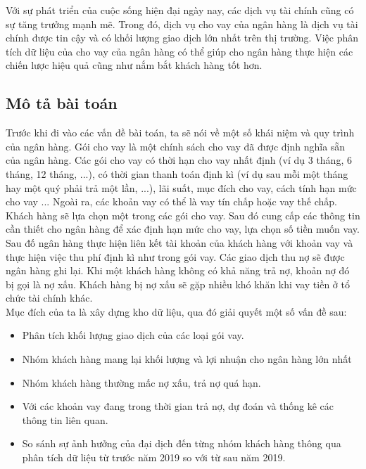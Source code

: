 \documentclass{article}
\begin{document}
\hspace{0.5cm} Với sự phát triển của cuộc sống hiện đại ngày nay, các dịch vụ tài chính cũng có sự tăng trưởng mạnh mẽ. Trong đó, dịch vụ
cho vay của ngân hàng là dịch vụ tài chính được tin cậy và có khối lượng giao dịch lớn nhất trên thị trường. 
Việc phân tích dữ liệu của cho vay của ngân hàng có thể giúp cho ngân hàng thực hiện các chiến lược hiệu quả
cũng như nắm bắt khách hàng tốt hơn.\\

\subsection{Mô tả bài toán}
\hspace{0.5cm} Trước khi đi vào các vấn đề bài toán, ta sẽ nói về một số khái niệm và quy trình của ngân hàng.
Gói cho vay là một chính sách cho vay đã được định nghĩa sẵn của ngân hàng. 
Các gói cho vay có thời hạn cho vay nhất định (ví dụ 3 tháng, 6 tháng, 12 tháng, ...), 
có thời gian thanh toán định kì (ví dụ sau mỗi một tháng hay một quý phải trả một lần, ...), lãi suất, mục đích cho vay,
cách tính hạn mức cho vay ... Ngoài ra, các khoản vay có thể là vay tín chấp hoặc vay thế chấp.\\

Khách hàng sẽ lựa chọn một trong các gói cho vay. Sau đó cung cấp các thông tin cần thiết cho ngân hàng để xác định hạn mức cho vay, lựa chọn số tiền muốn vay. Sau đố ngân hàng thực hiện liên kết tài khoản của khách hàng với khoản vay và thực hiện việc thu phí định kì
như trong gói vay. Các giao dịch thu nợ sẽ được ngân hàng ghi lại. Khi một khách hàng không có khả năng
trả nợ, khoản nợ đó bị gọi là nợ xấu. Khách hàng bị nợ xấu sẽ gặp nhiều khó khăn khi vay tiền ở tổ chức tài chính khác.\\

Mục đích của ta là xây dựng kho dữ liệu, qua đó giải quyết một số vấn đề sau:
\begin{itemize}
    \setlength\itemsep{0.3em}
    \item Phân tích khối lượng giao dịch của các loại gói vay. 
    \item Nhóm khách hàng mang lại khối lượng và lợi nhuận cho ngân hàng lớn nhất
    \item Nhóm khách hàng thường mấc nợ xấu, trả nợ quá hạn. 
    \item Với các khoản vay đang trong thời gian trả nợ, dự đoán và thống kê các thông tin liên quan.
    \item So sánh sự ảnh hưởng của đại dịch đến từng nhóm khách hàng thông qua phân tích dữ liệu từ trước năm 2019 so với từ sau năm 2019. 
\end{itemize}
\newpage
\end{document}
